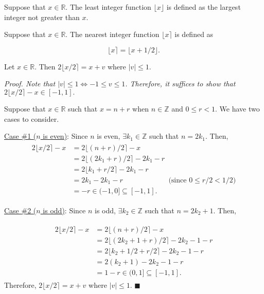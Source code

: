 \documentclass[../../main.tex]{subfiles}
\begin{document}
\begin{defn}
Suppose that $x \in \mathbb{R}$. The least integer function $\lfloor x \rfloor$ is defined as the largest integer not greater than $x$.
\end{defn}

\begin{defn}
Suppose that $x \in \mathbb{R}$. The nearest integer function $\lfloor x \rceil$ is defined as

\begin{equation*}
    \lfloor x \rceil = \lfloor x + 1/2 \rfloor.
\end{equation*}
\end{defn}

\begin{prop}
Let $x \in \mathbb{R}$. Then $2\lfloor x/2 \rceil = x+v$ where $|v|\leq 1.$
\end{prop}

\noindent \it{Proof.} Note that $|v|\leq 1 \iff -1 \leq v \leq 1$. Therefore, it suffices to show that $2\lfloor x/2 \rceil - x \in [-1,1].$

\noindent Suppose that $x \in \mathbb{R}$ such that $x=n+r$ when $n \in \mathbb{Z}$ and $0 \leq r \less 1$. We have two cases to consider.

\bigskip
\noindent\underline{Case \#1 ($n$ is even)}:
Since $n$ is even, $\exists k_1 \in \mathbb{Z}$ such that $n=2k_1$. Then,
\begin{equation*}
    \begin{split}
    \begin{aligned}
        2\lfloor x/2 \rceil - x &= 2\lfloor (n+r)/2 \rceil - x \\
        &= 2\lfloor (2k_1+r)/2 \rceil -2k_1-r \\
        &= 2\lfloor k_1+r/2 \rceil - 2k_1 -r \\ 
        &= 2k_1 - 2k_1 - r \qquad \qquad \qquad \text{   (since } 0 \leq r/2 \less 1/2\text{)} \\
        &= -r \in (-1,0] \subseteq[-1,1].
\end{aligned}
    \end{split}
\end{equation*}

\bigskip
\noindent\underline{Case \#2 ($n$ is odd)}:
Since $n$ is odd, $\exists k_2 \in \mathbb{Z}$ such that $n=2k_2+1$. Then,

\begin{equation*}
    \begin{split}
    \begin{aligned}
        2\lfloor x/2 \rceil - x &= 2\lfloor (n+r)/2 \rceil - x \\
        &= 2\lfloor (2k_2+1+r)/2 \rceil -2k_2-1-r \\
        &= 2\lfloor k_2 + 1/2 + r/2 \rceil - 2k_2 - 1 -r \\
        &= 2(k_2+1)-2k_2 -1-r \\
        &= 1-r \in (0,1] \subseteq [-1,1].
\end{aligned}
    \end{split}
\end{equation*}
\bigskip
\noindent Therefore, $2\lfloor x/2 \rceil = x +v$ where $|v|\leq 1$. $\blacksquare$
\end{document}
